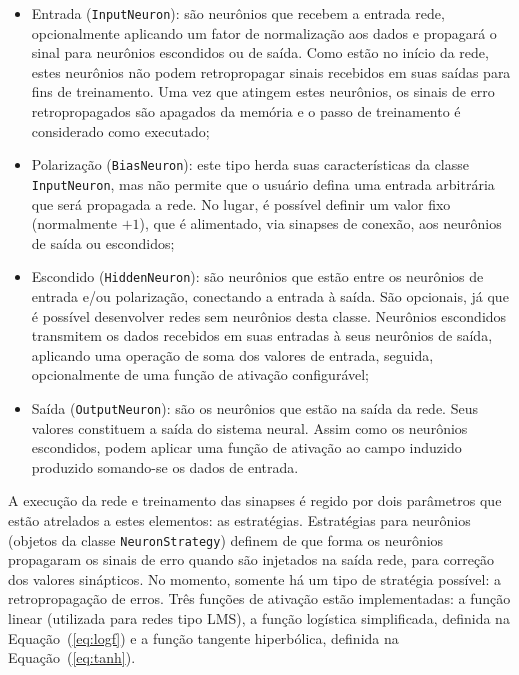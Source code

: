 \begin{itemize}
\item Entrada (\texttt{InputNeuron}): são neurônios que recebem a entrada
rede, opcionalmente aplicando um fator de normalização aos dados e propagará o
sinal para neurônios escondidos ou de saída. Como estão no início da rede,
estes neurônios não podem retropropagar sinais recebidos em suas saídas para
fins de treinamento. Uma vez que atingem estes neurônios, os sinais de erro
retropropagados são apagados da memória e o passo de treinamento é considerado
como executado;

\item Polarização (\texttt{BiasNeuron}): este tipo herda suas 
caracte\-rís\-ticas da classe \texttt{In\-put\-Neuron}, mas não permite que o
usu\-á\-rio defina uma entrada arbitrária que será propagada a rede. No lugar,
é possível definir um valor fixo (normalmente $+1$), que é alimentado, via
sinapses de conexão, aos neurônios de saída ou escondidos;

\item Escondido (\texttt{HiddenNeuron}): são neurônios que estão entre os
neurônios de entrada e/ou polarização, conectando a entrada à saída. São
opcionais, já que é possível desenvolver redes sem neurônios desta
classe. Neurônios escondidos transmitem os dados recebidos em suas entradas à
seus neurônios de saída, aplicando uma operação de soma dos valores de
entrada, seguida, opcionalmente de uma função de ativação configurável;

\item Saída (\texttt{OutputNeuron}): são os neurônios que estão na saída da
rede. Seus valores constituem a saída do sistema neural. Assim como os
neurônios escondidos, podem aplicar uma função de ativação ao campo induzido
produzido somando-se os dados de entrada.
\end{itemize}

A execução da rede e treinamento das sinapses é regido por dois parâmetros que
estão atrelados a estes elementos: as estratégias. Estratégias para neurônios
(objetos da classe \texttt{NeuronStrategy}) definem de que forma os neurônios
propagaram os sinais de erro quando são injetados na saída rede, para correção
dos valores sinápticos. No momento, somente há um tipo de stratégia possível:
a retropropagação de erros. Três funções de ativação estão implementadas: a
função linear (utilizada para redes tipo LMS), a função logística
simplificada, definida na Equação~(\ref{eq:logf}) e a função tangente
hiperbólica, definida na Equação~(\ref{eq:tanh}).

